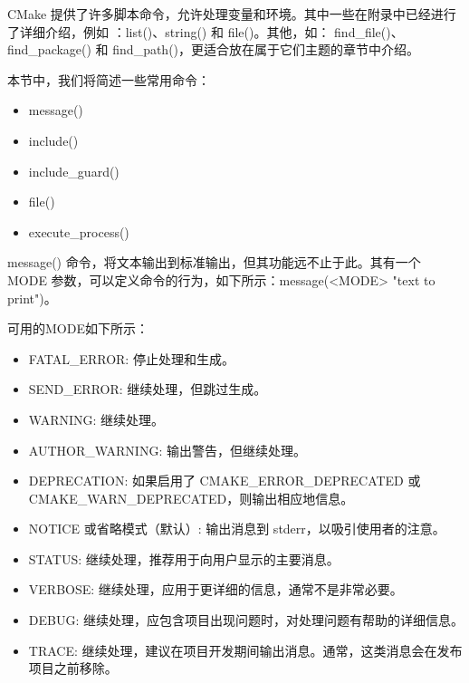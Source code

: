 
CMake 提供了许多脚本命令，允许处理变量和环境。其中一些在附录中已经进行了详细介绍，例如 ：list()、string() 和 file()。其他，如： find\_file()、find\_package() 和 find\_path()，更适合放在属于它们主题的章节中介绍。

本节中，我们将简述一些常用命令：

\begin{itemize}
\item
message()

\item
include()

\item
include\_guard()

\item
file()

\item
execute\_process()
\end{itemize}


message() 命令，将文本输出到标准输出，但其功能远不止于此。其有一个 MODE 参数，可以定义命令的行为，如下所示：message(<MODE> "text to print")。

可用的MODE如下所示：

\begin{itemize}
\item
FATAL\_ERROR: 停止处理和生成。

\item
SEND\_ERROR: 继续处理，但跳过生成。

\item
WARNING: 继续处理。

\item
AUTHOR\_WARNING: 输出警告，但继续处理。

\item
DEPRECATION: 如果启用了 CMAKE\_ERROR\_DEPRECATED 或 CMAKE\_WARN\_DEPRECATED，则输出相应地信息。

\item
NOTICE 或省略模式（默认）: 输出消息到 stderr，以吸引使用者的注意。

\item
STATUS: 继续处理，推荐用于向用户显示的主要消息。

\item
VERBOSE: 继续处理，应用于更详细的信息，通常不是非常必要。

\item
DEBUG: 继续处理，应包含项目出现问题时，对处理问题有帮助的详细信息。

\item
TRACE: 继续处理，建议在项目开发期间输出消息。通常，这类消息会在发布项目之前移除。
\end{itemize}

